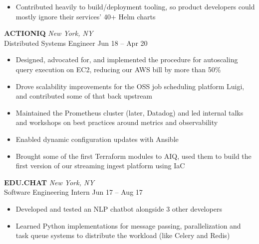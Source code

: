 \documentclass[letterpaper]{article}
\begin{document}
\begin{bgbox}[height=\paperheight, colback=white, width=0.62\textwidth]
\begin{itemize} [noitemsep,topsep=4pt]
			\item Contributed heavily to build/deployment tooling, so product developers could mostly ignore their services' 40+ Helm charts
		\end{itemize}
		\vspace*{12pt}
		\textbf{ACTIONIQ} \hfill \textit{New York, NY}\\
		Distributed Systems Engineer \hfill Jun 18 -- Apr 20
		\begin{itemize} [noitemsep,topsep=4pt]
			\item Designed, advocated for, and implemented the procedure for autoscaling query execution on EC2, reducing our AWS bill by more than 50\%
			\item Drove scalability improvements for the OSS job scheduling platform Luigi, and contributed some of that back upstream
			\item Maintained the Prometheus cluster (later, Datadog) and led internal talks and workshops on best practices around metrics and observability
			\item Enabled dynamic configuration updates with Ansible
			\item Brought some of the first Terraform modules to AIQ, used them to build \linebreak the first version of our streaming ingest platform using IaC
		\end{itemize}
		\vspace*{12pt}
		\textbf{EDU.CHAT} \hfill \textit{New York, NY}\\
		Software Engineering Intern \hfill Jun 17 -- Aug 17
		\begin{itemize} [noitemsep,topsep=4pt]
			\item Developed and tested an NLP chatbot alongside 3 other developers
			\item Learned Python implementations for message passing, parallelization and task queue systems to distribute the workload (like Celery and Redis)
		\end{itemize}
	\end{bgbox}%
\end{document}
